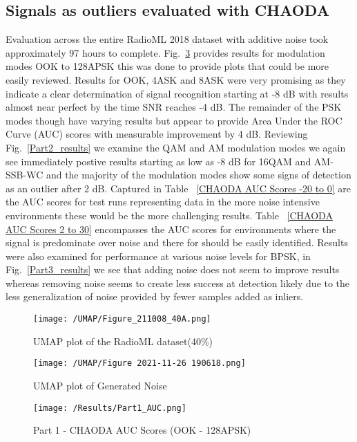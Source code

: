 \documentclass[conference]{IEEEtran}
\begin{document}
\subsection{Signals as outliers evaluated with CHAODA}
Evaluation across the entire RadioML 2018 dataset with additive noise took approximately 97 hours to complete.  Fig.~\ref{Part1_results} provides results for modulation modes OOK to  128APSK this was done to provide plots that could be more easily reviewed. Results for OOK, 4ASK and 8ASK were very promising as they indicate a clear determination of signal recognition starting at -8 dB with results almost near perfect  by the time SNR reaches -4 dB.  The remainder of the PSK modes though have varying results but appear to provide Area Under the ROC Curve (AUC) scores with measurable improvement by 4 dB.  Reviewing Fig.~\ref{Part2_results} we examine the QAM and AM modulation modes we again see immediately postive results starting as low as -8 dB for 16QAM and AM-SSB-WC and the majority of the modulation modes show some signs of detection as an outlier after 2 dB.   Captured in Table ~\ref{CHAODA AUC Scores -20 to 0} are the AUC scores for test runs representing data in the more noise intensive environments these would be the more challenging results.  Table ~\ref{CHAODA AUC Scores 2 to 30} encompasses the AUC scores for environments where the signal is predominate over noise and there for should be easily identified.  Results were also examined for performance at various noise levels for BPSK, in Fig.~\ref{Part3_results} we see that adding noise does not seem to improve results whereas removing noise seems to create less success at detection likely due to the less generalization of noise provided by fewer samples added as inliers. 

\begin{figure}[htbp]
\centering
\texttt{[image: /UMAP/Figure\_211008\_40A.png]}
\caption{UMAP plot of the RadioML dataset(40\%)}
\label{UMAP_40A}
\end{figure}

\begin{figure}[htbp]
\centering
\texttt{[image: /UMAP/Figure 2021-11-26 190618.png]}
\caption{UMAP plot of Generated Noise}
\label{noise}
\end{figure}

\begin{figure}[htbp]
\centering
\texttt{[image: /Results/Part1\_AUC.png]}
\caption{Part 1 - CHAODA AUC Scores (OOK - 128APSK)}
\label{Part1_results}
\end{figure}
\end{document}
